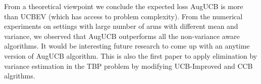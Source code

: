 From a theoretical viewpoint we conclude the expected loss AugUCB is more than UCBEV (which has access to problem complexity). From the numerical experiments on settings with large number of arms with different mean and variance, we observed that AugUCB outperforms all the non-variance aware algorithms. It would be interesting future research to come up with an anytime version of AugUCB algorithm. This is also the first paper to apply elimination by variance estimation in the TBP problem by modifying UCB-Improved and CCB algrithms. 